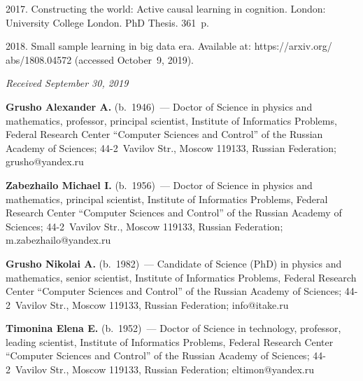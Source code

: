 \begin{multicols}{2}
{{\begin{thebibliography}{9}
\vspace*{2pt}

 2017. Constructing the world: 
Active causal learning in cognition.  London: University College London. PhD  Thesis. 361~p.

\vspace*{2pt}

 2018. Small sample learning in big data era. Available 
at: {\sf https://arxiv.org/ abs/1808.04572} (accessed October~9, 2019).
\end{thebibliography}

 }
 }

\end{multicols}

\vspace*{-6pt}

\hfill{\small\textit{Received September 30, 2019}}


\vspace*{-22pt}

\Contr


\noindent
\textbf{Grusho Alexander A.} (b.\ 1946)~--- Doctor of Science in physics and 
mathematics, professor, principal scientist, Institute of Informatics Problems, Federal 
Research Center ``Computer Sciences and Control'' of the Russian Academy of 
Sciences; 44-2~Vavilov Str., Moscow 119133, Russian Federation; 
\mbox{grusho@yandex.ru}

\vspace*{3pt} 

\noindent
\textbf{Zabezhailo Michael I.} (b.\ 1956)~--- Doctor of Science in physics and 
mathematics, principal scientist, Institute of Informatics Problems, Federal Research 
Center ``Computer Sciences and Control'' of the Russian Academy of Sciences;  
44-2~Vavilov Str., Moscow 119133, Russian Federation; 
\mbox{m.zabezhailo@yandex.ru} 

\vspace*{3pt}

\noindent
\textbf{Grusho Nikolai A.} (b.\ 1982)~--- Candidate of Science (PhD) in physics 
and mathematics, senior scientist, Institute of Informatics Problems, Federal 
Research Center ``Computer Sciences and Control'' of the Russian Academy of 
Sciences; 44-2~Vavilov Str., Moscow 119133, Russian Federation; 
\mbox{info@itake.ru} 
 
\vspace*{3pt}

\noindent
\textbf{Timonina Elena E.} (b.\ 1952)~--- Doctor of Science in technology, professor, 
leading scientist, Institute of Informatics Problems, Federal Research Center 
``Computer Sciences and Control'' of the Russian Academy of Sciences; 44-2~Vavilov 
Str., Moscow 119133, Russian Federation; \mbox{eltimon@yandex.ru}
\label{end\stat}

\renewcommand{\bibname}{\protect\rm Литература}  